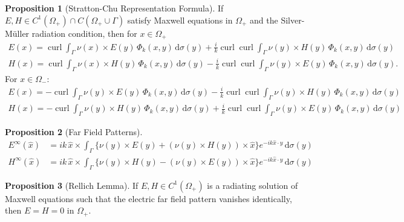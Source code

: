 \documentclass[a4paper,12pt]{article}
\theoremstyle{definition}
\newtheorem{prp}{Proposition}
\newcommand\bdr{\Gamma}
\newcommand\ints[2][y]{\int_{\bdr}#2\,\text{d}\sigma(#1)}
\DeclareMathOperator\curl{curl}
\begin{document}
\begin{prp}[Stratton-Chu Representation Formula]\label{prp:chu}
  If $E, H\in C^1(\Omega_+)\cap C(\Omega_+\cup\bdr)$ satisfy Maxwell equations in $\Omega_+$ and the Silver-M\"uller radiation condition, then for $x\in\Omega_+$
  \begin{align*}
    E(x) = \curl\ints{\nu(x)\times E(y)\,\Phi_k(x,y)}+\frac{i}{k}\curl\curl\ints{\nu(y)\times H(y)\,\Phi_k(x,y)}
  \end{align*}
  \begin{align*}
    H(x) = \curl\ints{\nu(x)\times H(y)\,\Phi_k(x,y)}-\frac{i}{k}\curl\curl\ints{\nu(y)\times E(y)\,\Phi_k(x,y)}.
  \end{align*}
For $x\in\Omega_-$: 
\begin{align*}
  E(x) = -\curl\ints{\nu(y)\times E(y)\,\Phi_k(x,y)}-\frac{i}{k}\curl\curl\ints{\nu(y)\times H(y)\,\Phi_k(x,y)}
\end{align*}
\begin{align*}
  H(x) = -\curl\ints{\nu(y)\times H(y)\,\Phi_k(x,y)}+\frac{i}{k}\curl\curl\ints{\nu(y)\times E(y)\,\Phi_k(x,y)}
\end{align*}
\end{prp}

\begin{prp}[Far Field Patterns]\label{prp:far}
  \begin{align*}
    E^\infty(\hat{x}) &= ik\,\hat{x}\times\ints{\bigl\{\nu(y)\times E(y)+(\nu(y)\times H(y))\times\hat{x}\bigr\}e^{-ik\hat{x}\cdot y}} \\
    H^\infty(\hat{x}) &= ik\,\hat{x}\times\ints{\bigl\{\nu(y)\times H(y)-(\nu(y)\times E(y))\times\hat{x}\bigr\}e^{-ik\hat{x}\cdot y}} 
  \end{align*}
\end{prp}

\begin{prp}[Rellich Lemma]
  If $E, H\in C^1(\Omega_+)$ is a radiating solution of Maxwell equations such that the electric far field pattern vanishes identically, then $E=H=0$ in $\Omega_+$.
\end{prp}
\end{document}
